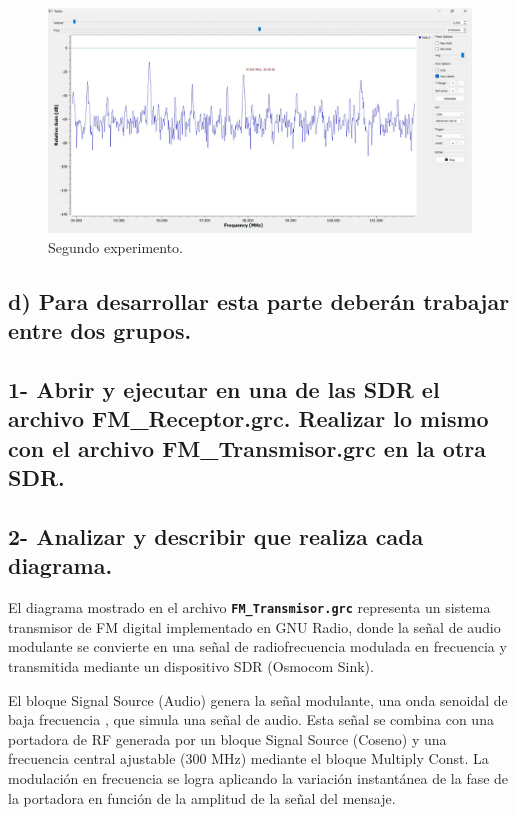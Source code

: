 \begin{figure}[H]
    \centering
    \includegraphics[width=0.9\linewidth]{imagenes/Parte_2/Actividad_14/14_c.jpg}
    \caption{Segundo experimento.}
    \label{fig:ejercicio_14b2}
\end{figure}

\subsection*{d) Para desarrollar esta parte deberán trabajar entre dos grupos.}

\subsection*{1-  Abrir y ejecutar en una de las SDR el archivo FM\_Receptor.grc. Realizar lo mismo con el archivo FM\_Transmisor.grc en la otra SDR.}

\subsection*{2- Analizar y describir que realiza cada diagrama.}

El diagrama mostrado en el archivo \textbf{\texttt{FM\_Transmisor.grc}} representa un sistema transmisor de FM digital implementado en GNU Radio, donde la señal de audio modulante se convierte en una señal de radiofrecuencia modulada en frecuencia y transmitida mediante un dispositivo SDR (Osmocom Sink).

El bloque Signal Source (Audio) genera la señal modulante, una onda senoidal de baja frecuencia , que simula una señal de audio. Esta señal se combina con una portadora de RF generada por un bloque Signal Source (Coseno) y una frecuencia central ajustable (300 MHz) mediante el bloque Multiply Const. La modulación en frecuencia se logra aplicando la variación instantánea de la fase de la portadora en función de la amplitud de la señal del mensaje.


